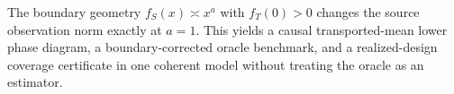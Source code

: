 The boundary geometry \(f_S(x)\asymp x^a\) with \(f_T(0)>0\) changes the source observation norm exactly at \(a=1\). This yields a causal transported-mean lower phase diagram, a boundary-corrected oracle benchmark, and a realized-design coverage certificate in one coherent model without treating the oracle as an estimator.